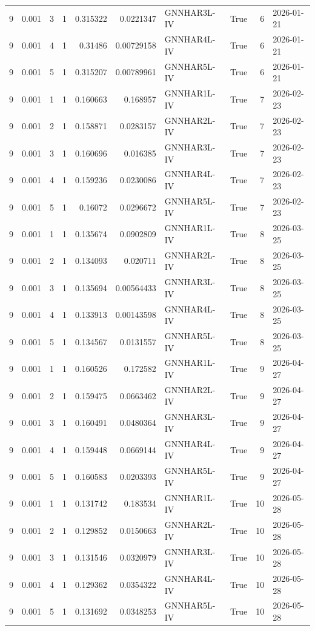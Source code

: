 \begin{tabular}{rrrrrrlrrl}
9 & 0.001 & 3 & 1 & 0.315322 & 0.0221347 & GNNHAR3L-IV & True & 6 & 2026-01-21 \\
9 & 0.001 & 4 & 1 & 0.31486 & 0.00729158 & GNNHAR4L-IV & True & 6 & 2026-01-21 \\
9 & 0.001 & 5 & 1 & 0.315207 & 0.00789961 & GNNHAR5L-IV & True & 6 & 2026-01-21 \\
9 & 0.001 & 1 & 1 & 0.160663 & 0.168957 & GNNHAR1L-IV & True & 7 & 2026-02-23 \\
9 & 0.001 & 2 & 1 & 0.158871 & 0.0283157 & GNNHAR2L-IV & True & 7 & 2026-02-23 \\
9 & 0.001 & 3 & 1 & 0.160696 & 0.016385 & GNNHAR3L-IV & True & 7 & 2026-02-23 \\
9 & 0.001 & 4 & 1 & 0.159236 & 0.0230086 & GNNHAR4L-IV & True & 7 & 2026-02-23 \\
9 & 0.001 & 5 & 1 & 0.16072 & 0.0296672 & GNNHAR5L-IV & True & 7 & 2026-02-23 \\
9 & 0.001 & 1 & 1 & 0.135674 & 0.0902809 & GNNHAR1L-IV & True & 8 & 2026-03-25 \\
9 & 0.001 & 2 & 1 & 0.134093 & 0.020711 & GNNHAR2L-IV & True & 8 & 2026-03-25 \\
9 & 0.001 & 3 & 1 & 0.135694 & 0.00564433 & GNNHAR3L-IV & True & 8 & 2026-03-25 \\
9 & 0.001 & 4 & 1 & 0.133913 & 0.00143598 & GNNHAR4L-IV & True & 8 & 2026-03-25 \\
9 & 0.001 & 5 & 1 & 0.134567 & 0.0131557 & GNNHAR5L-IV & True & 8 & 2026-03-25 \\
9 & 0.001 & 1 & 1 & 0.160526 & 0.172582 & GNNHAR1L-IV & True & 9 & 2026-04-27 \\
9 & 0.001 & 2 & 1 & 0.159475 & 0.0663462 & GNNHAR2L-IV & True & 9 & 2026-04-27 \\
9 & 0.001 & 3 & 1 & 0.160491 & 0.0480364 & GNNHAR3L-IV & True & 9 & 2026-04-27 \\
9 & 0.001 & 4 & 1 & 0.159448 & 0.0669144 & GNNHAR4L-IV & True & 9 & 2026-04-27 \\
9 & 0.001 & 5 & 1 & 0.160583 & 0.0203393 & GNNHAR5L-IV & True & 9 & 2026-04-27 \\
9 & 0.001 & 1 & 1 & 0.131742 & 0.183534 & GNNHAR1L-IV & True & 10 & 2026-05-28 \\
9 & 0.001 & 2 & 1 & 0.129852 & 0.0150663 & GNNHAR2L-IV & True & 10 & 2026-05-28 \\
9 & 0.001 & 3 & 1 & 0.131546 & 0.0320979 & GNNHAR3L-IV & True & 10 & 2026-05-28 \\
9 & 0.001 & 4 & 1 & 0.129362 & 0.0354322 & GNNHAR4L-IV & True & 10 & 2026-05-28 \\
9 & 0.001 & 5 & 1 & 0.131692 & 0.0348253 & GNNHAR5L-IV & True & 10 & 2026-05-28 \\
\bottomrule
\end{tabular}
